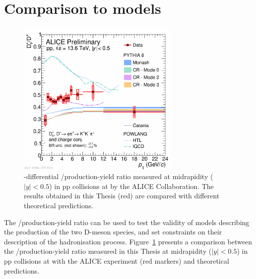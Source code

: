 \section{Comparison to models}
\begin{figure}[htb]
    \centering
    \includegraphics[width=0.7\textwidth]{Figures/Chapter 7/dsoverdpluscomparisonmodels_0.pdf}
    \caption{\pt-differential \ds/\dpl production-yield ratio measured at midrapidity ($\lvert y\rvert<0.5$) in pp collisions at \thirteen by the ALICE Collaboration. The results obtained in this Thesis (red) are compared with different theoretical predictions.}
    \label{fig:dsdplvsmodels}
\end{figure}
The \ds/\dpl production-yield ratio can be used to test the validity of models describing the production of the two D-meson species, and set constraints on their description of the hadronisation process. Figure~\ref{fig:dsdplvsmodels} presents a comparison between the \ds/\dpl production-yield ratio measured in this Thesis at midrapidity ($\lvert y\rvert<0.5$) in pp collisions at \thirteen with the ALICE experiment (red markers) and theoretical predictions. 

